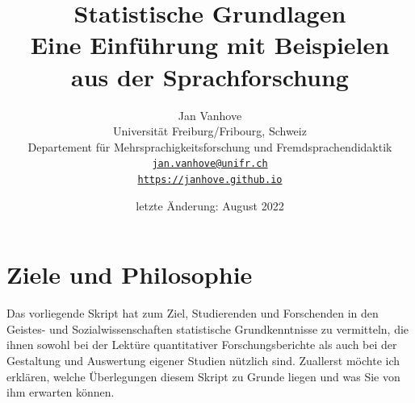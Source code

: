 \documentclass[oneside, 10pt]{book}\usepackage[]{graphicx}\usepackage[]{xcolor}
\title{{\Huge Statistische Grundlagen} 
\vspace{0.3 cm}\\
{\huge Eine Einführung mit Beispielen\\ aus der Sprachforschung}}
\author{{\LARGE Jan Vanhove} 
\vspace{1.5 cm} \\ 
Universität Freiburg/Fribourg, Schweiz\\ 
Departement für Mehrsprachigkeitsforschung und Fremdsprachendidaktik 
\vspace{1.5 cm} \\
\href{mailto:jan.vanhove@unifr.ch}{\texttt{jan.vanhove@unifr.ch}}\\
\href{http://janhove.github.io}{\texttt{https://janhove.github.io}}}
\date{letzte Änderung: August 2022}
\begin{document}
\frontmatter

\maketitle

\setcounter{tocdepth}{1}
\tableofcontents

\mainmatter


\chapter{Ziele und Philosophie}
Das vorliegende Skript hat zum Ziel,
Studierenden und Forschenden in den Geistes- und Sozialwissenschaften
statistische Grundkenntnisse zu vermitteln, die ihnen sowohl bei der 
Lektüre quantitativer Forschungsberichte als auch bei der Gestaltung 
und Auswertung eigener Studien nützlich sind.
Zuallerst möchte ich erklären, welche Überlegungen diesem Skript
zu Grunde liegen und was Sie von ihm erwarten können.
\end{document}
